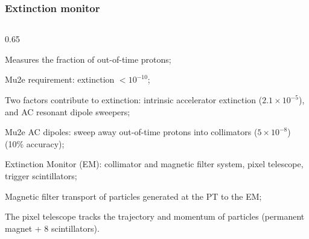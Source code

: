 \documentclass{beamer}
\begin{document}
\begin{frame}
    \frametitle{Extinction monitor}
    \vspace{-3mm}
    \begin{columns}
        \begin{column}{0.65\framewidth}
            \setlength{\leftmargini}{1.1em}
           
               \begin{itemize}
              {\small  
      \item Measures the fraction of out-of-time
protons;
\item Mu2e requirement: extinction $<10^{-10}$;
\item Two factors contribute to extinction: intrinsic accelerator
extinction ($2.1 \times 10^{-5}$), and AC resonant dipole sweepers;
\item Mu2e AC dipoles: sweep away out-of-time protons into
collimators ($5\times 10^{-8}$) (10\% accuracy);
\item Extinction Monitor (EM): collimator and magnetic filter 
system, pixel telescope, trigger scintillators; 
\item Magnetic filter transport of particles generated at the PT to the EM;
\item The pixel telescope tracks the trajectory and momentum of particles (permanent magnet + 8 scintillators).

}
\end{itemize}
\end{column}
\end{columns}
\end{frame}
\end{document}
